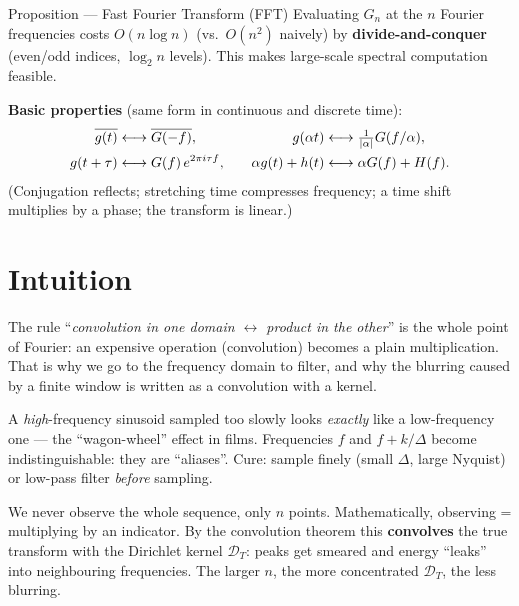 \documentclass[11pt]{article}
\providecommand{\Dir}{\mathcal{D}}
\begin{document}
\begin{result}{Proposition --- Fast Fourier Transform (FFT)}
Evaluating $G_n$ at the $n$ Fourier frequencies costs $O(n\log n)$ (vs.\ $O(n^2)$ naively) by \textbf{divide-and-conquer} (even/odd indices, $\log_2 n$ levels). This makes large-scale spectral computation feasible.
\end{result}

\textbf{Basic properties} (same form in continuous and discrete time):
\[
\begin{aligned}
\overline{g(t)} &\longleftrightarrow \overline{G(-f)}, &\quad
g(\alpha t) &\longleftrightarrow \tfrac{1}{\left\lvert \alpha \right\rvert}G(f/\alpha),\\
g(t+\tau) &\longleftrightarrow G(f)\,e^{2\pi i \tau f}, &\quad
\alpha g(t)+h(t) &\longleftrightarrow \alpha G(f)+H(f).
\end{aligned}
\]
(Conjugation reflects; stretching time compresses frequency; a time shift multiplies by a phase; the transform is linear.)

\section*{Intuition}

\begin{intu}[Convolution = product: the Swiss-army rule]
The rule ``\emph{convolution in one domain $\leftrightarrow$ product in the other}'' is the whole point of Fourier: an expensive operation (convolution) becomes a plain multiplication. That is why we go to the frequency domain to filter, and why the blurring caused by a finite window is written as a convolution with a kernel.
\end{intu}

\begin{intu}
A \emph{high}-frequency sinusoid sampled too slowly looks \emph{exactly} like a low-frequency one --- the ``wagon-wheel'' effect in films. Frequencies $f$ and $f+k/\Delta$ become indistinguishable: they are ``aliases''. Cure: sample finely (small $\Delta$, large Nyquist) or low-pass filter \emph{before} sampling.
\end{intu}

\begin{intu}[Finite window = blurred vision]
We never observe the whole sequence, only $n$ points. Mathematically, observing = multiplying by an indicator. By the convolution theorem this \textbf{convolves} the true transform with the Dirichlet kernel $\Dir_T$: peaks get smeared and energy ``leaks'' into neighbouring frequencies. The larger $n$, the more concentrated $\Dir_T$, the less blurring.
\end{intu}
\end{document}
